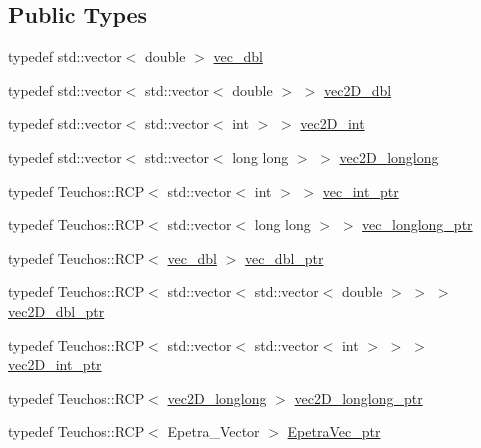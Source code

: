 \subsection*{Public Types}
\begin{DoxyCompactItemize}
\item 
typedef std\+::vector$<$ double $>$ \hyperlink{classFEDD_1_1ExporterParaViewAMR_a40cb07542819da8787f6326b973488e1}{vec\+\_\+dbl}
\item 
typedef std\+::vector$<$ std\+::vector$<$ double $>$ $>$ \hyperlink{classFEDD_1_1ExporterParaViewAMR_a0f12f69d4a09396adfd3204eaff68547}{vec2\+D\+\_\+dbl}
\item 
typedef std\+::vector$<$ std\+::vector$<$ int $>$ $>$ \hyperlink{classFEDD_1_1ExporterParaViewAMR_a7b4b80f7055a9b668338811a95fe60a9}{vec2\+D\+\_\+int}
\item 
typedef std\+::vector$<$ std\+::vector$<$ long long $>$ $>$ \hyperlink{classFEDD_1_1ExporterParaViewAMR_a82b93635433d181e29755ccf170b09c2}{vec2\+D\+\_\+longlong}
\item 
typedef Teuchos\+::\+R\+CP$<$ std\+::vector$<$ int $>$ $>$ \hyperlink{classFEDD_1_1ExporterParaViewAMR_a45e7db5ec3faf02fd1e2501ea28ba3dd}{vec\+\_\+int\+\_\+ptr}
\item 
typedef Teuchos\+::\+R\+CP$<$ std\+::vector$<$ long long $>$ $>$ \hyperlink{classFEDD_1_1ExporterParaViewAMR_a48d0c5c5de711255407680b44226ce70}{vec\+\_\+longlong\+\_\+ptr}
\item 
typedef Teuchos\+::\+R\+CP$<$ \hyperlink{classFEDD_1_1ExporterParaViewAMR_a40cb07542819da8787f6326b973488e1}{vec\+\_\+dbl} $>$ \hyperlink{classFEDD_1_1ExporterParaViewAMR_af14032ec6d32d3bef9ecf62bd31591a0}{vec\+\_\+dbl\+\_\+ptr}
\item 
typedef Teuchos\+::\+R\+CP$<$ std\+::vector$<$ std\+::vector$<$ double $>$ $>$ $>$ \hyperlink{classFEDD_1_1ExporterParaViewAMR_a01fe5fb6093914c1a246219c8c8db248}{vec2\+D\+\_\+dbl\+\_\+ptr}
\item 
typedef Teuchos\+::\+R\+CP$<$ std\+::vector$<$ std\+::vector$<$ int $>$ $>$ $>$ \hyperlink{classFEDD_1_1ExporterParaViewAMR_a6cdd4907c293ad65ad49fe42f9d4f77b}{vec2\+D\+\_\+int\+\_\+ptr}
\item 
typedef Teuchos\+::\+R\+CP$<$ \hyperlink{classFEDD_1_1ExporterParaViewAMR_a82b93635433d181e29755ccf170b09c2}{vec2\+D\+\_\+longlong} $>$ \hyperlink{classFEDD_1_1ExporterParaViewAMR_aed19e265c08b5c593ba39b5ab0999da4}{vec2\+D\+\_\+longlong\+\_\+ptr}
\item 
typedef Teuchos\+::\+R\+CP$<$ Epetra\+\_\+\+Vector $>$ \hyperlink{classFEDD_1_1ExporterParaViewAMR_abfc9203b3f170a56305f5c8cac3692d7}{Epetra\+Vec\+\_\+ptr}

\end{DoxyCompactItemize}
